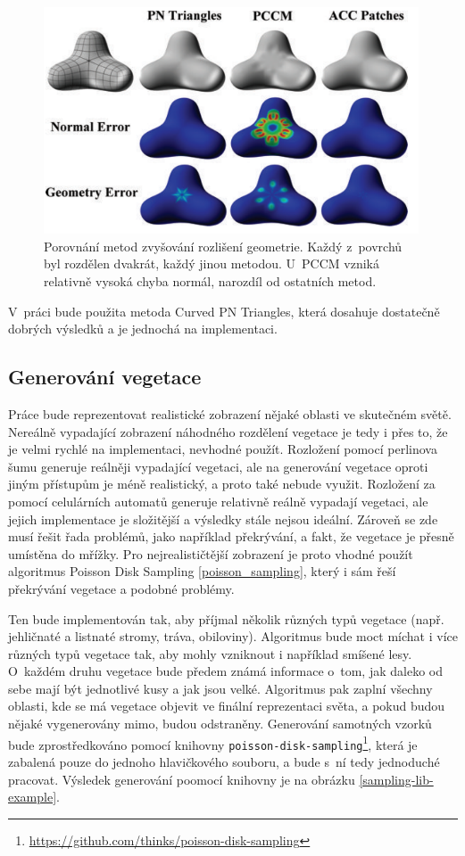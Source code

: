 \begin{figure}[H]
	\centering
	\includegraphics[width=30em]{images/navrh/compare-tess.png}
	\caption[caption]{Porovnání metod zvyšování rozlišení geometrie. Každý z~povrchů byl rozdělen dvakrát, každý jinou metodou. U~PCCM vzniká relativně vysoká chyba normál, narozdíl od ostatních metod.\footnotemark} 
	\label{tess-methods-comp}
\end{figure}

V~práci bude použita metoda Curved PN Triangles, která dosahuje dostatečně dobrých výsledků a je jednochá na implementaci.  

\subsection*{Generování vegetace}
Práce bude reprezentovat realistické zobrazení nějaké oblasti ve skutečném světě. Nereálně vypadající zobrazení náhodného rozdělení vegetace je tedy i přes to, že je velmi rychlé na implementaci, nevhodné použít. Rozložení pomocí perlinova šumu generuje reálněji vypadající vegetaci, ale na generování vegetace oproti jiným přístupům je méně realistický, a proto také nebude využit. Rozložení za pomocí celulárních automatů generuje relativně reálně vypadají vegetaci, ale jejich implementace je složitější a výsledky stále nejsou ideální. Zároveň se zde musí řešit řada problémů, jako například překrývání, a fakt, že vegetace je přesně umístěna do mřížky. Pro nejrealističtější zobrazení je proto vhodné použít algoritmus Poisson Disk Sampling \ref{poisson_sampling}, který i sám řeší překrývání vegetace a podobné problémy. 

Ten bude implementován tak, aby příjmal několik různých typů vegetace (např. jehličnaté a listnaté stromy, tráva, obiloviny). Algoritmus bude moct míchat i více různých typů vegetace tak, aby mohly vzniknout i například smíšené lesy. O~každém druhu vegetace bude předem známá informace o~tom, jak daleko od sebe mají být jednotlivé kusy a jak jsou velké. Algoritmus pak zaplní všechny oblasti, kde se má vegetace objevit ve finální reprezentaci světa, a pokud budou nějaké vygenerovány mimo, budou odstraněny. Generování samotných vzorků bude zprostředkováno pomocí knihovny \label{sampling-lib}\verb|poisson-disk-sampling|\footnote{\href{https://github.com/thinks/poisson-disk-sampling}{https://github.com/thinks/poisson-disk-sampling}}, která je zabalená pouze do jednoho hlavičkového souboru, a bude s~ní tedy jednoduché pracovat. Výsledek generování poomocí knihovny je na obrázku \ref{sampling-lib-example}.

